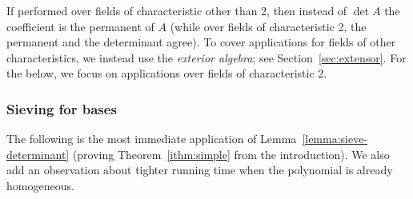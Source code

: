 \documentclass[10pt,a4paper]{article}
\begin{document}
If performed over fields of characteristic other than 2, then instead
of $\det A$ the coefficient is the permanent of $A$ (while over fields
of characteristic 2, the permanent and the determinant agree). To
cover applications for fields of other characteristics, we instead use
the \emph{exterior algebra}; see Section~\ref{sec:extensor}. For the
below, we focus on applications over fields of characteristic 2. 

\subsubsection{Sieving for bases} \label{sec:sieve-basis}

The following is the most immediate application of Lemma~\ref{lemma:sieve-determinant}
(proving Theorem~\ref{ithm:simple} from the introduction).
We also add an observation about tighter running time when the
polynomial is already homogeneous. 
\end{document}
